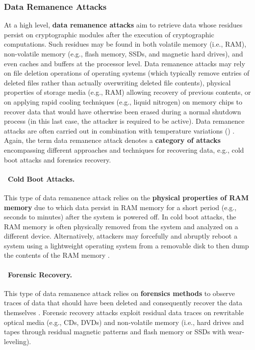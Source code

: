 \subsubsection{Data Remanence Attacks}\label{sec:security_of_cryptographic_algorithms:attacks:dra}

At a high level, \textbf{data remanence attacks} aim to retrieve data whose residues persist on cryptographic modules after the execution of cryptographic computations. Such residues may be found in both volatile memory (i.e., RAM), non-volatile memory (e.g., flash memory, SSDs, and magnetic hard drives), and even caches and buffers at the processor level. Data remanence attacks may rely on file deletion operations of operating systems (which typically remove entries of deleted files rather than actually overwriting deleted file contents), physical properties of storage media (e.g., RAM) allowing recovery of previous contents, or on applying rapid cooling techniques (e.g., liquid nitrogen) on memory chips to recover data that would have otherwise been erased during a normal shutdown process (in this last case, the attacker is required to be active). Data remanence attacks are often carried out in combination with temperature variations () \cite{anagnostopoulos_low_2018}. Again, the term data remanence attack denotes a \textbf{category of attacks} encompassing different approaches and techniques for recovering data, e.g., cold boot attacks and forensics recovery. 

\paragraph*{\faSnowflake~Cold Boot Attacks.} This type of data remanence attack relies on the \textbf{physical properties of RAM memory} due to which data persist in RAM memory for a short period (e.g., seconds to minutes) after the system is powered off. In cold boot attacks, the RAM memory is often physically removed from the system and analyzed on a different device. Alternatively, attackers may forcefully and abruptly reboot a system using a lightweight operating system from a removable disk to then dump the contents of the RAM memory \cite{halderman_lest_2009}.

\paragraph*{\faMicroscope~Forensic Recovery.} This type of data remanence attack relies on \textbf{forensics methods} to observe traces of data that should have been deleted and consequently recover the data themselves \cite{weingart_physical_2000}. Forensic recovery attacks exploit residual data traces on rewritable optical media (e.g., CDs, DVDs) and non-volatile memory (i.e., hard drives and tapes through residual magnetic patterns and flash memory or SSDs with wear-leveling).

